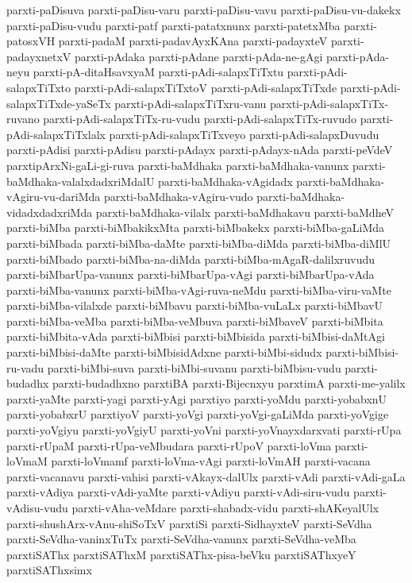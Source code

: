 {parxti-paDisuva
parxti-paDisu-varu
parxti-paDisu-vavu
parxti-paDisu-vu-dakekx
parxti-paDisu-vudu
parxti-patf
parxti-patatxnunx
parxti-patetxMba
parxti-patosxVH
parxti-padaM
parxti-padavAyxKAna
parxti-padayxteV
parxti-padayxnetxV
parxti-pAdaka
parxti-pAdane
parxti-pAda-ne-gAgi
parxti-pAda-neyu
parxti-pA-ditaHsavxyaM
parxti-pAdi-salapxTiTxtu
parxti-pAdi-salapxTiTxto
parxti-pAdi-salapxTiTxtoV
parxti-pAdi-salapxTiTxde
parxti-pAdi-salapxTiTxde-yaSeTx
parxti-pAdi-salapxTiTxru-vanu
parxti-pAdi-salapxTiTx-ruvano
parxti-pAdi-salapxTiTx-ru-vudu
parxti-pAdi-salapxTiTx-ruvudo
parxti-pAdi-salapxTiTxlalx
parxti-pAdi-salapxTiTxveyo
parxti-pAdi-salapxDuvudu
parxti-pAdisi
parxti-pAdisu
parxti-pAdayx
parxti-pAdayx-nAda
parxti-peVdeV
parxtipArxNi-gaLi-gi-ruva
parxti-baMdhaka
parxti-baMdhaka-vanunx
parxti-baMdhaka-valalxdadxriMdalU
parxti-baMdhaka-vAgidadx
parxti-baMdhaka-vAgiru-vu-dariMda
parxti-baMdhaka-vAgiru-vudo
parxti-baMdhaka-vidadxdadxriMda
parxti-baMdhaka-vilalx
parxti-baMdhakavu
parxti-baMdheV
parxti-biMba
parxti-biMbakikxMta
parxti-biMbakekx
parxti-biMba-gaLiMda
parxti-biMbada
parxti-biMba-daMte
parxti-biMba-diMda
parxti-biMba-diMlU
parxti-biMbado
parxti-biMba-na-diMda
parxti-biMba-mAgaR-dalilxruvudu
parxti-biMbarUpa-vanunx
parxti-biMbarUpa-vAgi
parxti-biMbarUpa-vAda
parxti-biMba-vanunx
parxti-biMba-vAgi-ruva-neMdu
parxti-biMba-viru-vaMte
parxti-biMba-vilalxde
parxti-biMbavu
parxti-biMba-vuLaLx
parxti-biMbavU
parxti-biMba-veMba
parxti-biMba-veMbuva
parxti-biMbaveV
parxti-biMbita
parxti-biMbita-vAda
parxti-biMbisi
parxti-biMbisida
parxti-biMbisi-daMtAgi
parxti-biMbisi-daMte
parxti-biMbisidAdxne
parxti-biMbi-sidudx
parxti-biMbisi-ru-vadu
parxti-biMbi-suva
parxti-biMbi-suvanu
parxti-biMbisu-vudu
parxti-budadhx
parxti-budadhxno
parxtiBA
parxti-Bijecnxyu
parxtimA
parxti-me-yalilx
parxti-yaMte
parxti-yagi
parxti-yAgi
parxtiyo
parxti-yoMdu
parxti-yobabxnU
parxti-yobabxrU
parxtiyoV
parxti-yoVgi
parxti-yoVgi-gaLiMda
parxti-yoVgige
parxti-yoVgiyu
parxti-yoVgiyU
parxti-yoVni
parxti-yoVnayxdarxvati
parxti-rUpa
parxti-rUpaM
parxti-rUpa-veMbudara
parxti-rUpoV
parxti-loVma
parxti-loVmaM
parxti-loVmamf
parxti-loVma-vAgi
parxti-loVmAH
parxti-vacana
parxti-vacanavu
parxti-vahisi
parxti-vAkayx-dalUlx
parxti-vAdi
parxti-vAdi-gaLa
parxti-vAdiya
parxti-vAdi-yaMte
parxti-vAdiyu
parxti-vAdi-siru-vudu
parxti-vAdisu-vudu
parxti-vAha-veMdare
parxti-shabadx-vidu
parxti-shAKeyalUlx
parxti-shushArx-vAnu-shiSoTxV
parxtiSi
parxti-SidhayxteV
parxti-SeVdha
parxti-SeVdha-vaninxTuTx
parxti-SeVdha-vanunx
parxti-SeVdha-veMba
parxtiSAThx
parxtiSAThxM
parxtiSAThx-pisa-beVku
parxtiSAThxyeY
parxtiSAThxsimx
}
